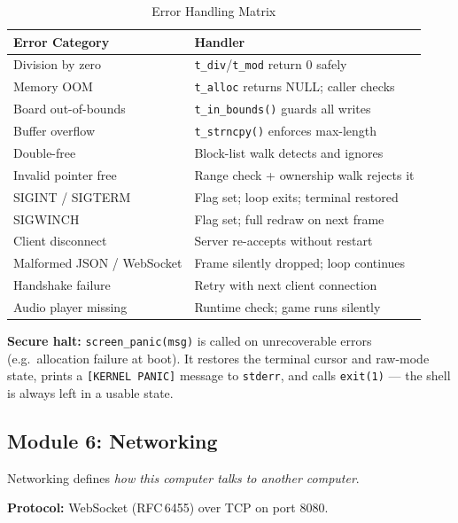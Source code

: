 \documentclass[conference]{IEEEtran}
\begin{document}
\begin{table}[H]
\centering
\caption{Error Handling Matrix}
\begin{tabular}{ll}
\toprule
\textbf{Error Category}      & \textbf{Handler}                        \\
\midrule
Division by zero             & \texttt{t\_div}/\texttt{t\_mod} return 0 safely \\
Memory OOM                   & \texttt{t\_alloc} returns NULL; caller checks \\
Board out-of-bounds          & \texttt{t\_in\_bounds()} guards all writes \\
Buffer overflow              & \texttt{t\_strncpy()} enforces max-length \\
Double-free                  & Block-list walk detects and ignores      \\
Invalid pointer free         & Range check + ownership walk rejects it  \\
SIGINT / SIGTERM             & Flag set; loop exits; terminal restored  \\
SIGWINCH                     & Flag set; full redraw on next frame      \\
Client disconnect            & Server re-accepts without restart        \\
Malformed JSON / WebSocket   & Frame silently dropped; loop continues   \\
Handshake failure            & Retry with next client connection        \\
Audio player missing         & Runtime check; game runs silently        \\
\bottomrule
\end{tabular}
\end{table}

\textbf{Secure halt:} \texttt{screen\_panic(msg)} is called on unrecoverable errors (e.g.\ allocation failure at boot). It restores the terminal cursor and raw-mode state, prints a \texttt{[KERNEL PANIC]} message to \texttt{stderr}, and calls \texttt{exit(1)} --- the shell is always left in a usable state.

\subsection{Module 6: Networking}
Networking defines \textit{how this computer talks to another computer}.

\textbf{Protocol:} WebSocket (RFC\,6455) over TCP on port 8080.
\end{document}
